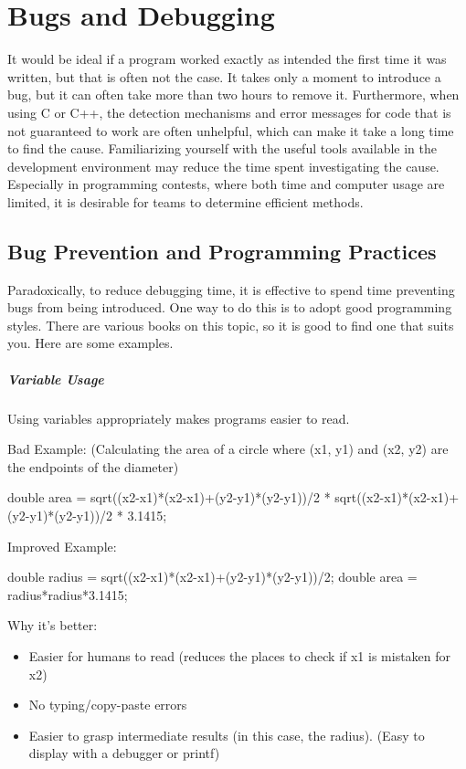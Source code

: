 \chapter{Bugs and Debugging}\label{chapter:debug}

It would be ideal if a program worked exactly as intended the first time it was written, but that is often not the case. It takes only a moment to introduce a bug, but it can often take more than two hours to remove it. Furthermore, when using C or C++, the detection mechanisms and error messages for code that is not guaranteed to work are often unhelpful, which can make it take a long time to find the cause.
Familiarizing yourself with the useful tools available in the development environment may reduce the time spent investigating the cause.
Especially in programming contests, where both time and computer usage are limited, it is desirable for teams to determine efficient methods.

\section{Bug Prevention and Programming Practices}
Paradoxically, to reduce debugging time, it is effective to spend time preventing bugs from being introduced. One way to do this is to adopt good programming styles.
There are various books on this topic, so it is good to find one that suits you. Here are some examples.

\paragraph{Variable Usage} Using variables appropriately makes programs easier to read.

Bad Example: (Calculating the area of a circle where (x1, y1) and (x2, y2) are the endpoints of the diameter)
\begin{cbox}
double area = sqrt((x2-x1)*(x2-x1)+(y2-y1)*(y2-y1))/2
 * sqrt((x2-x1)*(x2-x1)+(y2-y1)*(y2-y1))/2 * 3.1415;\end{cbox}
Improved Example:
\begin{cbox}
double radius = sqrt((x2-x1)*(x2-x1)+(y2-y1)*(y2-y1))/2;
double area = radius*radius*3.1415;\end{cbox}
Why it's better:
\begin{itemize}
\setlength{\itemsep}{0pt}
\item Easier for humans to read (reduces the places to check if x1 is mistaken for x2)
\item No typing/copy-paste errors
\item Easier to grasp intermediate results (in this case, the radius). (Easy to display with a debugger or printf)
\end{itemize}

